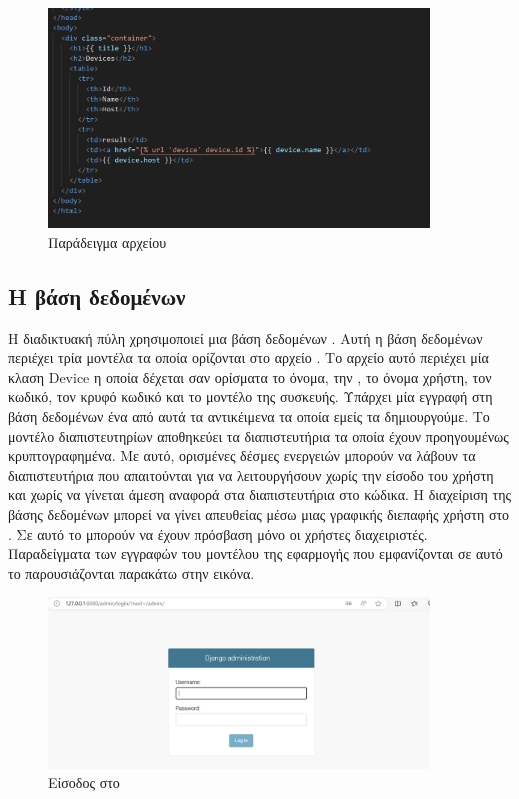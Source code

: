 \begin{figure}[htb]
	\centering
	\includegraphics[width=0.9\textwidth]{graphics/html_template.png}
	\caption{Παράδειγμα  αρχείου }
\end{figure}






\subsection{Η βάση δεδομένων}
Η διαδικτυακή πύλη χρησιμοποιεί μια βάση δεδομένων . Αυτή η βάση δεδομένων περιέχει τρία
μοντέλα τα οποία ορίζονται στο αρχείο . Το αρχείο αυτό περιέχει μία κλαση Device η οποία δέχεται σαν ορίσματα
το όνομα, την , το όνομα χρήστη, τον κωδικό, τον κρυφό κωδικό και το μοντέλο της συσκευής.
Υπάρχει μία εγγραφή στη βάση δεδομένων ένα από αυτά τα αντικέιμενα τα οποία εμείς τα δημιουργούμε. Το μοντέλο διαπιστευτηρίων αποθηκεύει τα διαπιστευτήρια τα οποία έχουν προηγουμένως
κρυπτογραφημένα. Με αυτό, ορισμένες δέσμες ενεργειών μπορούν να λάβουν τα διαπιστευτήρια που απαιτούνται για να λειτουργήσουν
χωρίς την είσοδο του χρήστη και χωρίς να γίνεται άμεση αναφορά στα διαπιστευτήρια στο
κώδικα.
Η διαχείριση της βάσης δεδομένων μπορεί να γίνει απευθείας μέσω μιας γραφικής διεπαφής χρήστη
 στο . Σε αυτό το  μπορούν να έχουν πρόσβαση μόνο οι χρήστες διαχειριστές. Παραδείγματα
των εγγραφών του μοντέλου της εφαρμογής  που εμφανίζονται σε αυτό το  παρουσιάζονται παρακάτω στην εικόνα.

\begin{figure}[htb]
	\centering
	\includegraphics[width=0.9\textwidth]{graphics/GUI_LOGIN.png}
	\caption{Είσοδος στο }
\end{figure}

